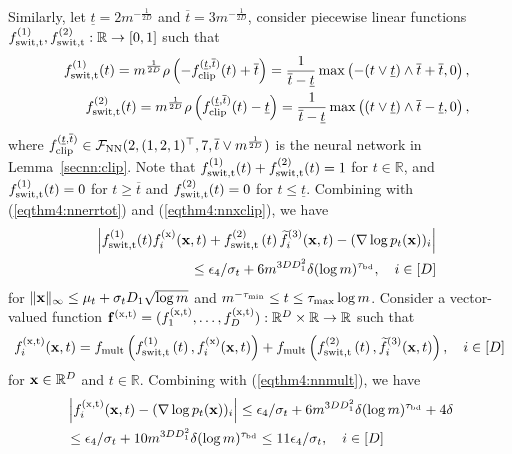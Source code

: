 \documentclass[twoside,11pt]{article}
\def\cF{\mathcal F}
\newcommand{\bff}{{\bf f}}
\newcommand{\bx}{{\bf x}}
\newcommand{\bbR}{{\mathbb R}}
\newcommand{\be}{\begin{equation}}
\newcommand{\ee}{\end{equation}}
\newcommand{\bean}{\setlength\arraycolsep{1pt}\begin{eqnarray*}}
\newcommand{\eean}{\end{eqnarray*}}
\begin{document}
Similarly, let $\underline{t} = 2m^{-\frac{1}{2D}}$ and $\overline{t} = 3m^{-\frac{1}{2D}}$, consider piecewise linear functions $f_{\rm swit, t}^{(1)}, f_{\rm swit, t}^{(2)} : \bbR \to [0,1]$ such that
\bean
&& f_{\rm swit, t}^{(1)} (t) =  m^{\frac{1}{2D}}  \rho \left( -f_{\rm clip}^{(\underline{t}, \overline{t})} (t) + \overline{t} \right) = \frac{1}{\overline{t} - \underline{t}} \max\left( - (t \vee \underline{t}) \wedge \overline{t}  + \overline{t}, 0 \right),
\\
&& f_{\rm swit, t}^{(2)} (t) =  m^{\frac{1}{2D}}   \rho \left( f_{\rm clip}^{(\underline{t}, \overline{t})} (t) - \underline{t} \right) = \frac{1}{\overline{t} - \underline{t}} \max\left(  (t \vee \underline{t}) \wedge \overline{t}  - \underline{t}, 0 \right),
\eean
where $f_{\rm clip}^{(\underline{t}, \overline{t})} \in \cF_{\rm NN}(2,(1,2,1)^{\top}, 7, \overline{t} \vee m^{\frac{1}{2D}} )$ is the neural network in Lemma~\ref{secnn:clip}.
Note that $f_{\rm swit, t}^{(1)}(t) + f_{\rm swit, t}^{(2)}(t) = 1$ for $t \in \bbR$, and $f_{\rm swit, t}^{(1)}(t) = 0$ for $t \geq \overline{t}$ and $f_{\rm swit, t}^{(2)}(t) = 0$ for $t \leq \underline{t}$.
Combining with (\ref{eqthm4:nnerrtot}) and (\ref{eqthm4:nnxclip}), we have
\bean
&& \left\vert f_{\rm swit, t}^{(1)}(t)  f_{i}^{({\rm x})} (\bx,t) + f_{\rm swit, t}^{(2)} \left( t  \right)  \widetilde f_{i}^{(3)}(\bx,t) - (\nabla \log p_t (\bx))_{i}    \right\vert
\\
&& \leq \epsilon_{4} / \sigma_{t} + 6m^{3D D_{1}^2 } \delta (\log m)^{\tau_{\rm bd}}, \quad i \in [D]
\eean
for $\|\bx\|_{\infty} \leq  \mu_t + \sigma_t D_{1} \sqrt{\log m}$ and $m^{-\tau_{\rm min}} \leq t \leq \tau_{\rm max} \log m$.
Consider a vector-valued function $\bff^{(\rm x,t)}  = ( f_1^{(\rm x,t)},\ldots,f_D^{(\rm x,t)} ) : \bbR^{D} \times \bbR \rightarrow \bbR$ such that
\bean
f_i^{(\rm x,t)} (\bx,t) = f_{\rm mult} \left( f_{\rm swit, t}^{(1)} \left(t \right),   f_{i}^{({\rm x})}(\bx,t) \right) + f_{\rm mult} \left( f_{\rm swit, t}^{(2)}  \left(t \right)  , \widetilde f_{i}^{(3)}(\bx,t) \right), \quad i \in [D]
\eean
for $\bx \in \bbR^{D}$ and $t \in \bbR$.
Combining with (\ref{eqthm4:nnmult}), we have
\be \begin{split}
& \left\vert f_i^{(\rm x,t)} (\bx,t) - (\nabla \log p_t (\bx))_{i}    \right\vert
\leq \epsilon_{4} / \sigma_{t} + 6m^{3D D_{1}^2 } \delta (\log m)^{\tau_{\rm bd}}  + 4\delta
\\
& \leq \epsilon_{4} / \sigma_{t} + 10 m^{3D D_{1}^2 } \delta (\log m)^{\tau_{\rm bd}} \leq 11 \epsilon_{4} / \sigma_{t}, \quad i \in [D]
\label{eqthm4:nnerrfin}
\end{split} \ee
\end{document}
